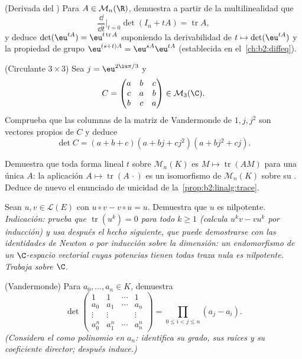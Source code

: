 \begin{exercise}[$\star\star$]\label{exo:b2:linalg:7}
(Derivada del ) Para $A \in \mathcal{M}_n(\R)$, demuestra
a partir de la multilinealidad que
\[
\frac{\dd}{\dd t}\Big|_{t=0} \det(I_n + tA) = \operatorname{tr} A ,
\]
y deduce $\det(\eu^{tA}) = \eu^{t\operatorname{tr} A}$ suponiendo la
derivabilidad de $t \mapsto \det(\eu^{tA})$ y la propiedad de grupo
$\eu^{(s+t)A} = \eu^{sA}\eu^{tA}$ (establecida en el~\cref{ch:b2:diffeq}).
\end{exercise}

\begin{exercise}[$\star\star$]\label{exo:b2:linalg:8}
(Circulante $3 \times 3$) Sea $j = \eu^{2\iu\pi/3}$ y
\[
C = \begin{pmatrix}
a & b & c\\
c & a & b\\
b & c & a
\end{pmatrix} \in \mathcal{M}_3(\C).
\]
Comprueba que las columnas de la matriz de Vandermonde de $1, j, j^2$
son vectores propios de $C$ y deduce
\[
\det C = (a + b + c)(a + bj + cj^2)(a + bj^2 + cj).
\]
\end{exercise}

\begin{exercise}[$\star\star\star$]\label{exo:b2:linalg:9}
Demuestra que toda forma lineal $t$ sobre $\mathcal{M}_n(K)$ es $M
\mapsto \operatorname{tr}(AM)$ para una única $A$: la aplicación $A
\mapsto \operatorname{tr}(A\,\cdot)$ es un isomorfismo de
$\mathcal{M}_n(K)$ sobre su . Deduce de nuevo el enunciado de
unicidad de la~\cref{prop:b2:linalg:trace}.
\end{exercise}

\begin{exercise}[$\star\star\star$]\label{exo:b2:linalg:10}
Sean $u, v \in \mathcal{L}(E)$ con $u \circ v - v \circ u = u$.
Demuestra que $u$ es nilpotente. \emph{Indicación: prueba que
$\operatorname{tr}(u^k) = 0$ para todo $k \geq 1$ (calcula $u^k v - v
u^k$ por inducción) y usa después el hecho siguiente, que puede
demostrarse con las identidades de Newton o por inducción sobre la
dimensión: un endomorfismo de un $\C$-espacio vectorial cuyas
potencias tienen todas traza nula es nilpotente. Trabaja sobre $\C$.}
\end{exercise}

\begin{exercise}[$\star\star$]\label{exo:b2:linalg:11}
(Vandermonde) Para $a_0, \dots, a_n \in K$, demuestra
\[
\det\begin{pmatrix}
1 & 1 & \cdots & 1\\
a_0 & a_1 & \cdots & a_n\\
\vdots & \vdots & & \vdots\\
a_0^n & a_1^n & \cdots & a_n^n
\end{pmatrix}
= \prod_{0 \leq i < j \leq n} (a_j - a_i).
\]
\emph{(Considera el  como polinomio en $a_n$: identifica
su grado, sus raíces y su coeficiente director; después induce.)}
\end{exercise}


